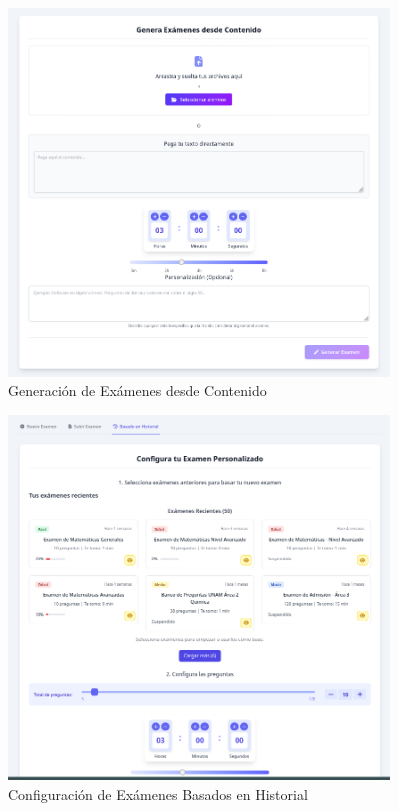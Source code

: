 \documentclass[12pt,a4paper]{report}
\begin{document}
\begin{figure}[h]
\centering
\includegraphics[width=0.9\textwidth]{250617_06h45m50s_screenshot.png}
\caption{Generación de Exámenes desde Contenido}
\label{fig:generacion_contenido}
\end{figure}

\begin{figure}[h]
\centering
\includegraphics[width=0.9\textwidth]{250617_06h46m12s_screenshot.png}
\caption{Configuración de Exámenes Basados en Historial}
\label{fig:configuracion_historial}
\end{figure}
\end{document}
